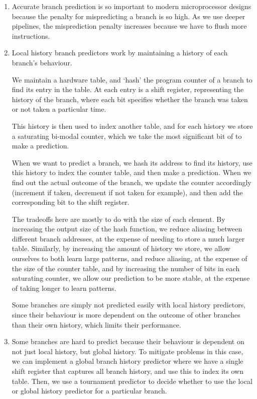 


\begin{enumerate}[label=(\alph*)]

  \item
    Accurate branch prediction is so important to modern microprocessor designs because the penalty for mispredicting a branch is so high. As we use deeper pipelines, the misprediction penalty increases because we have to flush more instructions.

    \item

      Local history branch predictors work by maintaining a history of each branch's behaviour.

      We maintain a hardware table, and `hash' the program counter of a branch to find its entry in the table. At each entry is a shift register, representing the history of the branch, where each bit specifies whether the branch was taken or not taken a particular time.

      This history is then used to index another table, and for each history we store a saturating bi-modal counter, which we take the most significant bit of to make a prediction.

      When we want to predict a branch, we hash its address to find its history, use this history to index the counter table, and then make a prediction. When we find out the actual outcome of the branch, we update the counter accordingly (increment if taken, decrement if not taken for example), and then add the corresponding bit to the shift register.

      The tradeoffs here are mostly to do with the size of each element. By increasing the output size of the hash function, we reduce aliasing between different branch addresses, at the expense of needing to store a much larger table. Similarly, by increasing the amount of history we store, we allow ourselves to both learn large patterns, and reduce aliasing, at the expense of the size of the counter table, and by increasing the number of bits in each saturating counter, we allow our prediction to be more stable, at the expense of taking longer to learn patterns.

      Some branches are simply not predicted easily with local history predictors, since their behaviour is more dependent on the outcome of other branches than their own history, which limits their performance.

      \item
         Some branches are hard to predict because their behaviour is dependent on not just local history, but global history. To mitigate problems in this case, we can implement a global branch history predictor where we have a single shift register that captures all branch history, and use this to index its own table. Then, we use a tournament predictor to decide whether to use the local or global history predictor for a particular branch.


\end{enumerate}

